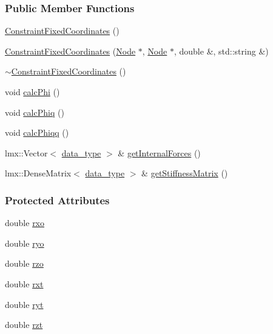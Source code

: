 \subsubsection*{Public Member Functions}
\begin{DoxyCompactItemize}
\item 
\hyperlink{classmknix_1_1_constraint_fixed_coordinates_aaa5e21e995ca95bb8dc45a411987fda2}{Constraint\-Fixed\-Coordinates} ()
\item 
\hyperlink{classmknix_1_1_constraint_fixed_coordinates_a0e45a40d38156a55c34380238d369592}{Constraint\-Fixed\-Coordinates} (\hyperlink{classmknix_1_1_node}{Node} $\ast$, \hyperlink{classmknix_1_1_node}{Node} $\ast$, double \&, std\-::string \&)
\item 
\hyperlink{classmknix_1_1_constraint_fixed_coordinates_ab8fcae0a6b615cbc81d1db67887c1a54}{$\sim$\-Constraint\-Fixed\-Coordinates} ()
\item 
void \hyperlink{classmknix_1_1_constraint_fixed_coordinates_ae549d41c12fcc094bdc32bc853ebbd84}{calc\-Phi} ()
\item 
void \hyperlink{classmknix_1_1_constraint_fixed_coordinates_a250813aed17ab80b03a9b6b7f4a7ce8b}{calc\-Phiq} ()
\item 
void \hyperlink{classmknix_1_1_constraint_fixed_coordinates_a80e20da8642dc3c35b7969f7c2c5affe}{calc\-Phiqq} ()
\item 
lmx\-::\-Vector$<$ \hyperlink{namespacemknix_a16be4b246fbf2cceb141e3a179111020}{data\-\_\-type} $>$ \& \hyperlink{classmknix_1_1_constraint_fixed_coordinates_a24c5ba96ad8fcdba23d6fbeda1e87583}{get\-Internal\-Forces} ()
\item 
lmx\-::\-Dense\-Matrix$<$ \hyperlink{namespacemknix_a16be4b246fbf2cceb141e3a179111020}{data\-\_\-type} $>$ \& \hyperlink{classmknix_1_1_constraint_fixed_coordinates_a85f3564f2109d0cdf09f99b1ff5eea24}{get\-Stiffness\-Matrix} ()
\end{DoxyCompactItemize}
\subsubsection*{Protected Attributes}
\begin{DoxyCompactItemize}
\item 
double \hyperlink{classmknix_1_1_constraint_fixed_coordinates_a07324acb35594ed9274bc8b79ca356c1}{rxo}
\item 
double \hyperlink{classmknix_1_1_constraint_fixed_coordinates_a1e5c7b99aad5c0c1752d3fa5154ff77e}{ryo}
\item 
double \hyperlink{classmknix_1_1_constraint_fixed_coordinates_a1e43b5f72d8064762f0427204f46b3a1}{rzo}
\item 
double \hyperlink{classmknix_1_1_constraint_fixed_coordinates_afb8e43d7544941154e51c93e0662ef93}{rxt}
\item 
double \hyperlink{classmknix_1_1_constraint_fixed_coordinates_ade68140fb4d4f9e0cb0d2996274e222a}{ryt}
\item 
double \hyperlink{classmknix_1_1_constraint_fixed_coordinates_a45657121be64f04cf1667a9090ba6451}{rzt}
\end{DoxyCompactItemize}


